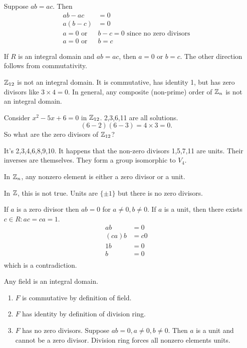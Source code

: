 \documentclass[class=article,crop=false]{standalone}
\begin{document}
\begin{prf}
Suppose $ ab=ac$. Then
 \begin{align*}
	ab-ac&= 0 \\
	a(b-c)&= 0 \\
	a=0 \text{ or } & b-c=0 \text{ since no zero divisors}\\  
	a=0 \text{ or } &b=c 
\end{align*}
\end{prf}
\begin{thm}[]
If $ R$ is an integral domain and  $ ab=ac$, then  $ a=0$ or  $ b=c$. The other direction follows from commutativity.
\end{thm}
\begin{eg}[bad]
	$ \mathbb{Z}_{12}$ is not an integral domain. It is commutative, has identity 1, but has zero divisors like $ 3\times 4=0$. In general, any composite (non-prime) order of $ \mathbb{Z}_n$ is not an integral domain.

	Consider $ x^2-5x+6=0$ in $ \mathbb{Z}_{12}$. 2,3,6,11 are all solutions. 
	\[
		(6-2)(6-3)=4\times 3=0
	.\] 
So what are the zero divisors of $ \mathbb{Z}_{12}$?

It's 2,3,4,6,8,9,10. It happens that the non-zero divisors 1,5,7,11 are units. Their inverses are themselves. They form a group isomorphic to $ V_4$. 

\begin{prop}[]
In $ \mathbb{Z}_n$, any nonzero element is either a zero divisor or a unit.
\end{prop}
\begin{note}[]
In $ \mathbb{Z}$, this is not true. Units are $ \{\pm 1\} $ but there is no zero divisors.
\end{note}

\begin{prf}
If $ a$ is a zero divisor then  $ ab=0$ for  $ a\neq 0, b\neq 0$.
If  $ a$ is a unit, then there exists  $ c \in R: ac=ca=1$.
\begin{align*}
	ab&=0\\
	(ca)b&= c0 \\
	1b&= 0 \\
	b &= 0 \\
\end{align*}
which is a contradiction.
\end{prf}
\end{eg}
\begin{thm}[]
	Any field is an integral domain.
\end{thm}

\begin{prf}
	\begin{enumerate}[label=(\roman*)]
		\item $ F$ is commutative by definition of field.
		\item $ F$ has identity by definition of division ring.
		\item  $ F$ has no zero divisors. Suppose  $ ab=0, a\neq 0, b\neq 0$. Then  $ a$ is a unit and cannot be a zero divisor.  Division ring forces all nonzero elements units.
	\end{enumerate}
\end{prf}
\end{document}
